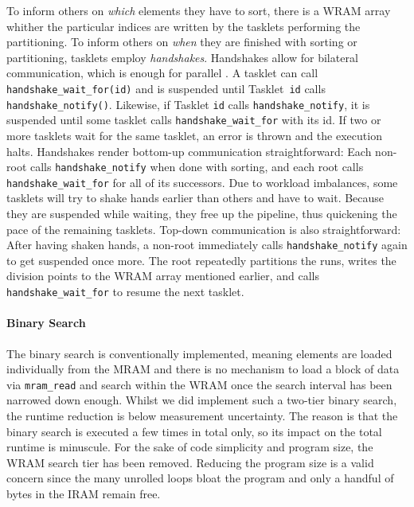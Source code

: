 To inform others on \emph{which} elements they have to sort, there is a \ac{WRAM} array whither the particular indices are written by the tasklets performing the partitioning.
To inform others on \emph{when} they are finished with sorting or partitioning, tasklets employ \emph{handshakes}.
Handshakes allow for bilateral communication, which is enough for parallel \MS{}.
A tasklet can call \lstinline|handshake_wait_for(id)| and is suspended until Tasklet~\lstinline|id| calls \lstinline|handshake_notify()|.
Likewise, if Tasklet \lstinline|id| calls \lstinline|handshake_notify|, it is suspended until some tasklet calls \lstinline|handshake_wait_for| with its id.
If two or more tasklets wait for the same tasklet, an error is thrown and the execution halts.
Handshakes render bottom-up communication straightforward:
Each non-root calls \lstinline|handshake_notify| when done with sorting, and each root calls \lstinline|handshake_wait_for| for all of its successors.
Due to workload imbalances, some tasklets will try to shake hands earlier than others and have to wait.
Because they are suspended while waiting, they free up the pipeline, thus quickening the pace of the remaining tasklets.
Top-down communication is also straightforward:
After having shaken hands, a non-root immediately calls \lstinline|handshake_notify| again to get suspended once more.
The root repeatedly partitions the runs, writes the division points to the \ac{WRAM} array mentioned earlier, and calls \lstinline|handshake_wait_for| to resume the next tasklet.


\paragraph{Binary Search}
The binary search is conventionally implemented, meaning elements are loaded individually from the \ac{MRAM} and there is no mechanism to load a block of data via \lstinline|mram_read| and search within the \ac{WRAM} once the search interval has been narrowed down enough.
Whilst we did implement such a two-tier binary search, the runtime reduction is below measurement uncertainty.
The reason is that the binary search is executed a few times in total only, so its impact on the total runtime is minuscule.
For the sake of code simplicity and program size, the \ac{WRAM} search tier has been removed.
Reducing the program size is a valid concern since the many unrolled loops bloat the program and only a handful of bytes in the \ac{IRAM} remain free.

